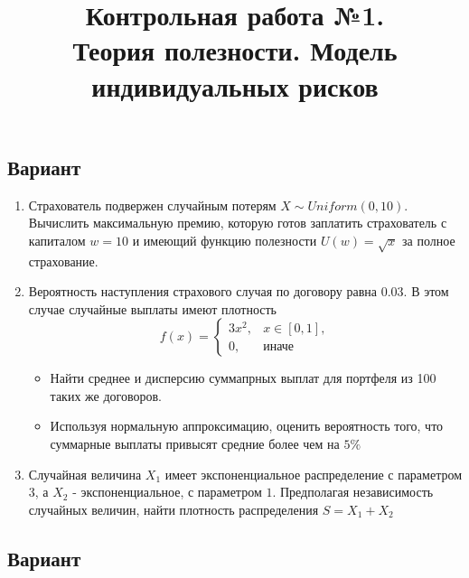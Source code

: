 \documentclass[12pt, letterpaper]{article}
\title{
	Контрольная работа №1. \\
	Теория полезности. Модель индивидуальных рисков
	}
\date{}
\begin{document}
\maketitle

\newpage

\begin{center}
	\section{Вариант}
\end{center}

\begin{enumerate}
	\item 

	Страхователь подвержен случайным потерям $X \sim Uniform(0, 10)$.
	Вычислить максимальную премию, которую готов заплатить страхователь с капиталом $w=10$ и имеющий функцию полезности $U(w) = \sqrt{x}$ за полное страхование.


\item
	Вероятность наступления страхового случая по договору равна $0.03$. В этом случае случайные выплаты имеют плотность
	\[
		f(x) = 
		\begin{cases}
			3x^2, & x \in [0, 1],\\
			0, & \text{иначе}
		\end{cases}
	\]
	\begin{itemize}
		\item Найти среднее и дисперсию суммапрных выплат для портфеля из 100 таких же договоров.
		\item Используя нормальную аппроксимацию, оценить вероятность того, что суммарные выплаты привысят средние более чем на $5\%$
	\end{itemize}
	
\item
	Случайная величина $X_1$ имеет экспоненциальное распределение с параметром 3, а $X_2$ - экспоненциальное, с параметром $1$.
	Предполагая независимость случайных величин, найти плотность распределения $S = X_1 + X_2$

\end{enumerate}

\newpage
\begin{center}
	\section{Вариант}
\end{center}
\end{document}
